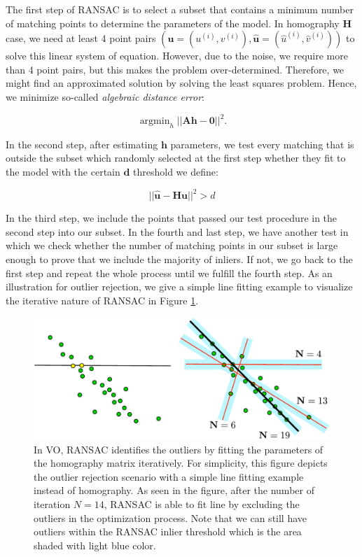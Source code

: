 \documentclass[12pt]{report}
\numberwithin{figure}{section}
\newcommand{\argmin}{\mathop{\mathrm{argmin}}}
\begin{document}
\begin{appendices}
The first step of RANSAC is to select a subset that contains a minimum number 
of matching points to determine the parameters of the model. In homography 
$\mathbf{H}$ case, we need at least 4 point pairs 
$(\mathbf{u}=(u^{(i)},v^{(i)}),\mathbf{\hat{u}}=(\hat{u}^{(i)},\hat{v}^{(i)}))$
to solve this linear system of equation. However, due to the noise, we 
require more than 4 point pairs, but this makes the problem over-determined. 
Therefore, we might find an approximated solution by solving the least squares 
problem. Hence, we minimize so-called \textit{algebraic distance error}:

\begin{equation}
\argmin_h || \mathbf{Ah-0}||^2.
\end{equation}

In the second step, after estimating $\mathbf{h}$ parameters, we test every 
matching that is outside the subset which randomly selected at the first 
step whether they fit to the model with the certain $\mathbf{d}$ threshold we 
define:

\begin{equation}
||\mathbf{\hat{u}} - \mathbf{H}\mathbf{u}||^2 > d
\end{equation}

In the third step, we include the points that passed our test procedure in the 
second step into our subset. In the fourth and last step, we have another test 
in 
which 
we check whether the number of matching points in our subset is large enough 
to prove that we include the majority of inliers. If not, we go back to 
the first step and repeat the whole process until we fulfill the fourth step. 
As an illustration for outlier rejection, we give a simple line fitting 
example to 
visualize the iterative nature of RANSAC in Figure \ref{fig:outlier_matches}.

\begin{figure}[H]
	\centering
	\includegraphics[width=0.8\linewidth,natwidth=640,natheight=640]
	{fig/drawings/ransac.pdf}
	\caption[Outlier Rejection with RANSAC]
	{In VO, RANSAC identifies the outliers by fitting the parameters of the 
		homography matrix iteratively.  For simplicity, this figure depicts 
		the 
		outlier 
		rejection scenario with a simple line fitting example instead of 
		homography. As seen in the figure, after the number of iteration 
		$N=14$, 
		RANSAC is able to fit line by excluding the outliers in the 
		optimization 
		process. Note that we can still have outliers within the RANSAC inlier 
		threshold which is the area shaded with light blue color.} 
	\label{fig:outlier_matches}
\end{figure}



\end{appendices}
\end{document}

